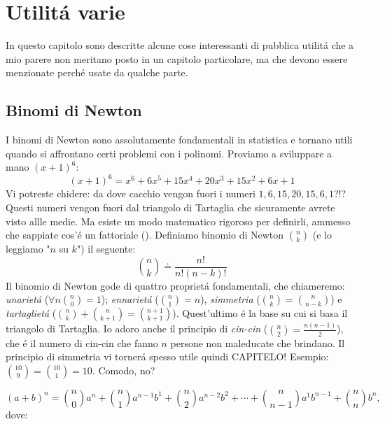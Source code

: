 \label{utilita}
\chapter{Utilit\'a varie}


In questo capitolo sono descritte alcune cose interessanti di pubblica utilit\'a che a mio parere non meritano posto in un capitolo particolare,
ma che devono essere menzionate perch\'e usate da qualche parte.

\label{binominewton}
\section{Binomi di Newton}

I binomi di Newton sono assolutamente fondamentali in statistica e tornano utili quando si affrontano certi problemi con i polinomi. Proviamo a sviluppare a mano $(x+1)^6$:
\begin{equation}
(x+1)^6=x^6+6x^5+15x^4+20x^3+15x^2+6x+1
\end{equation}
Vi potreste chidere: da dove cacchio vengon fuori i numeri $1,6,15,20,15,6,1$?!? Questi numeri vengon fuori dal triangolo di Tartaglia che sicuramente avrete visto allle medie.
Ma esiste un modo matematico rigoroso per definirli, ammesso che sappiate cos'\'e un fattoriale (). Definiamo binomio di Newton $\binom{n}{k}$ (e lo leggiamo "$n$ su $k$") il seguente:
\begin{equation}
\binom{n}{k} \doteq \frac{n!}{n!(n-k)!}
\end{equation}
Il binomio di Newton gode di quattro propriet\'a fondamentali, che chiameremo: {\em unariet\'a} ($\forall n \binom{n}{0}=1$); {\em ennariet\'a} ($\binom{n}{1}=n$),
 {\em simmetria} ($\binom{n}{k}=\binom{n}{n-k}$) e {\em tartagliet\'a} ($\binom{n}{k}+\binom{n}{k+1}=\binom{n+1}{k+1}$). Quest'ultimo \'e la base su cui si basa il triangolo di Tartaglia.
Io adoro anche il principio di {\em cin-cin} ($\binom{n}{2}=\frac{n(n-1)}{2}$), che \'e il numero di cin-cin che fanno $n$ persone non maleducate che brindano.
Il principio di simmetria vi torner\'a spesso utile quindi CAPITELO! Esempio: $\binom{10}{9}=\binom{10}{1}=10$. Comodo, no?

\begin{equation}
(a+b)^n=
	\binom{n}{0}a^n+\binom{n}{1}a^{n-1}b^1+\binom{n}{2}a^{n-2}b^2+\cdots+\binom{n}{n-1}a^1b^{n-1}+\binom{n}{n}b^n,
\end{equation}
dove:


